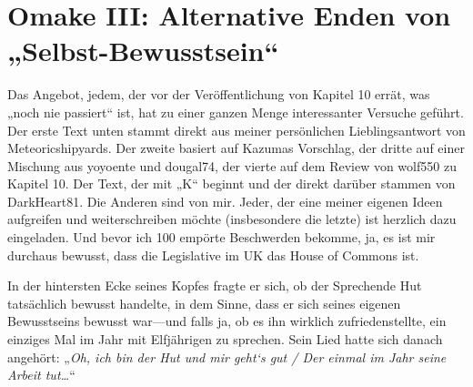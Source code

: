 







\section{Omake III: Alternative Enden von „Selbst-Bewusstsein“}

Das Angebot, jedem, der vor der Veröffentlichung von Kapitel 10 errät, was „noch nie passiert“ ist, hat zu einer ganzen Menge interessanter Versuche geführt. Der erste Text unten stammt direkt aus meiner persönlichen Lieblingsantwort von Meteoricshipyards. Der zweite basiert auf Kazumas Vorschlag, der dritte auf einer Mischung aus yoyoente und dougal74, der vierte auf dem Review von wolf550 zu Kapitel 10. Der Text, der mit „K“ beginnt und der direkt darüber stammen von DarkHeart81. Die Anderen sind von mir. Jeder, der eine meiner eigenen Ideen aufgreifen und weiterschreiben möchte (insbesondere die letzte) ist herzlich dazu eingeladen. Und bevor ich 100 empörte Beschwerden bekomme, ja, es ist mir durchaus bewusst, dass die Legislative im UK das House of Commons ist.%

\later

In der hintersten Ecke seines Kopfes fragte er sich, ob der Sprechende Hut tatsächlich bewusst handelte, in dem Sinne, dass er sich seines eigenen Bewusstseins bewusst war—und falls ja, ob es ihn wirklich zufriedenstellte, ein einziges Mal im Jahr mit Elfjährigen zu sprechen. Sein Lied hatte sich danach angehört: „\emph{Oh, ich bin der Hut und mir geht‘s gut / Der einmal im Jahr seine Arbeit tut…}“

